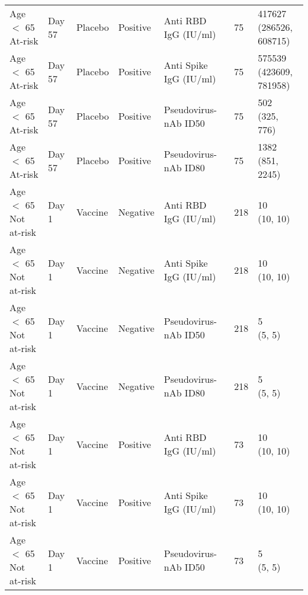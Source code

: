 \documentclass[]{book}
\theoremstyle{definition}
\theoremstyle{definition}
\theoremstyle{definition}
\newcommand{\1}{\mathbbm{1}}
\begin{document}
\begin{landscape}
\begin{ThreePartTable}
\begin{longtable}[t]{>{\raggedright\arraybackslash}p{7cm}llllll}
\hspace{1em}Age $<$ 65 At-risk & Day 57 & Placebo & Positive & Anti RBD IgG (IU/ml) & 75 & \makecell[l]{417627\\(286526, 608715)}\\
\hspace{1em}Age $<$ 65 At-risk & Day 57 & Placebo & Positive & Anti Spike IgG (IU/ml) & 75 & \makecell[l]{575539\\(423609, 781958)}\\
\hspace{1em}Age $<$ 65 At-risk & Day 57 & Placebo & Positive & Pseudovirus-nAb ID50 & 75 & \makecell[l]{502\\(325, 776)}\\
\hspace{1em}Age $<$ 65 At-risk & Day 57 & Placebo & Positive & Pseudovirus-nAb ID80 & 75 & \makecell[l]{1382\\(851, 2245)}\\
\hspace{1em}Age $<$ 65 Not at-risk & Day 1 & Vaccine & Negative & Anti RBD IgG (IU/ml) & 218 & \makecell[l]{10\\(10, 10)}\\
\hspace{1em}Age $<$ 65 Not at-risk & Day 1 & Vaccine & Negative & Anti Spike IgG (IU/ml) & 218 & \makecell[l]{10\\(10, 10)}\\
\hspace{1em}Age $<$ 65 Not at-risk & Day 1 & Vaccine & Negative & Pseudovirus-nAb ID50 & 218 & \makecell[l]{5\\(5, 5)}\\
\hspace{1em}Age $<$ 65 Not at-risk & Day 1 & Vaccine & Negative & Pseudovirus-nAb ID80 & 218 & \makecell[l]{5\\(5, 5)}\\
\hspace{1em}Age $<$ 65 Not at-risk & Day 1 & Vaccine & Positive & Anti RBD IgG (IU/ml) & 73 & \makecell[l]{10\\(10, 10)}\\
\hspace{1em}Age $<$ 65 Not at-risk & Day 1 & Vaccine & Positive & Anti Spike IgG (IU/ml) & 73 & \makecell[l]{10\\(10, 10)}\\
\hspace{1em}Age $<$ 65 Not at-risk & Day 1 & Vaccine & Positive & Pseudovirus-nAb ID50 & 73 & \makecell[l]{5\\(5, 5)}\\

\end{longtable}
\end{ThreePartTable}
\end{landscape}
\end{document}
